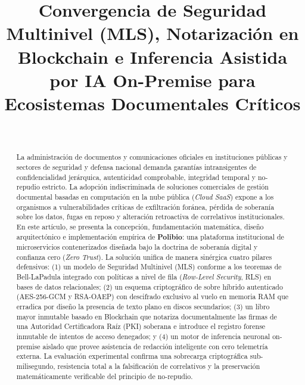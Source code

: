 \documentclass[journal,10pt]{IEEEtran}
\begin{document}
\title{Convergencia de Seguridad Multinivel (MLS), Notarización en Blockchain e Inferencia Asistida por IA On-Premise para Ecosistemas Documentales Críticos}


\author{
  \\
}

\maketitle

\begin{abstract}
La administración de documentos y comunicaciones oficiales en instituciones públicas y sectores de seguridad y defensa nacional demanda garantías intransigentes de confidencialidad jerárquica, autenticidad comprobable, integridad temporal y no-repudio estricto. La adopción indiscriminada de soluciones comerciales de gestión documental basadas en computación en la nube pública (\textit{Cloud SaaS}) expone a los organismos a vulnerabilidades críticas de exfiltración foránea, pérdida de soberanía sobre los datos, fugas en reposo y alteración retroactiva de correlativos institucionales. En este artículo, se presenta la concepción, fundamentación matemática, diseño arquitectónico e implementación empírica de \textbf{Polibio}: una plataforma institucional de microservicios contenerizados diseñada bajo la doctrina de soberanía digital y confianza cero (\textit{Zero Trust}). La solución unifica de manera sinérgica cuatro pilares defensivos: (1) un modelo de Seguridad Multinivel (MLS) conforme a los teoremas de Bell-LaPadula integrado con políticas a nivel de fila (\textit{Row-Level Security}, RLS) en bases de datos relacionales; (2) un esquema criptográfico de sobre híbrido autenticado (AES-256-GCM y RSA-OAEP) con descifrado exclusivo al vuelo en memoria RAM que erradica por diseño la presencia de texto plano en discos secundarios; (3) un libro mayor inmutable basado en Blockchain que notariza documentalmente las firmas de una Autoridad Certificadora Raíz (PKI) soberana e introduce el registro forense inmutable de intentos de acceso denegados; y (4) un motor de inferencia neuronal on-premise aislado que provee asistencia de redacción inteligente con cero telemetría externa. La evaluación experimental confirma una sobrecarga criptográfica sub-milisegundo, resistencia total a la falsificación de correlativos y la preservación matemáticamente verificable del principio de no-repudio.
\end{abstract}
\end{document}

